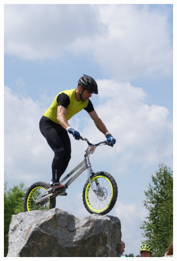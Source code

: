 \begin{figure}[H]
\begin{subfigure}{0.31\textwidth}
      \caption{}
    \end{subfigure}
    \begin{subfigure}{0.31\textwidth}
      \centering
      \includegraphics[scale=1.0]{obrazky/cropFang_Cb.jpg}
      \caption{}
      \label{obr:weightsB}
    \end{subfigure}
    \begin{subfigure}{0.31\textwidth}
      \centering

\end{subfigure}
\end{figure}
